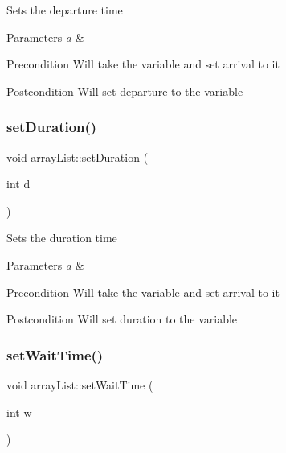 Sets the departure time 
\begin{DoxyParams}{Parameters}
{\em a} & \\
\hline
\end{DoxyParams}
\begin{DoxyPrecond}{Precondition}
Will take the variable and set arrival to it 
\end{DoxyPrecond}
\begin{DoxyPostcond}{Postcondition}
Will set departure to the variable 
\end{DoxyPostcond}
\mbox{\label{classarray_list_a69206417ce98eba086eace8d359b9fbf}} 
\subsubsection{\texorpdfstring{set\+Duration()}{setDuration()}}
{\footnotesize\ttfamily void array\+List\+::set\+Duration (\begin{DoxyParamCaption}\item[{int}]{d }\end{DoxyParamCaption})}

Sets the duration time 
\begin{DoxyParams}{Parameters}
{\em a} & \\
\hline
\end{DoxyParams}
\begin{DoxyPrecond}{Precondition}
Will take the variable and set arrival to it 
\end{DoxyPrecond}
\begin{DoxyPostcond}{Postcondition}
Will set duration to the variable 
\end{DoxyPostcond}
\mbox{\label{classarray_list_a4aaec98923f47fac43cceddb4de0bf64}} 
\subsubsection{\texorpdfstring{set\+Wait\+Time()}{setWaitTime()}}
{\footnotesize\ttfamily void array\+List\+::set\+Wait\+Time (\begin{DoxyParamCaption}\item[{int}]{w }\end{DoxyParamCaption})}

